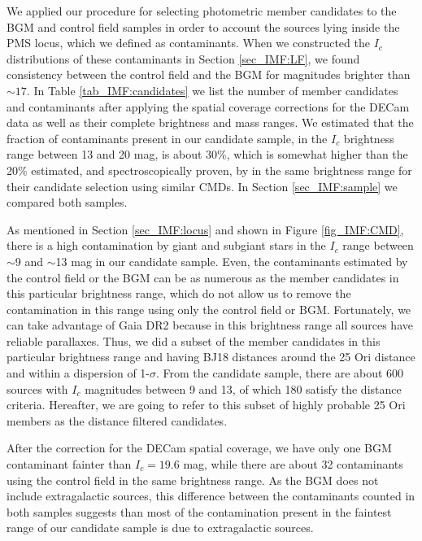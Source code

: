 \documentclass[12pt]{article}
\begin{document}
We applied our procedure for selecting photometric member candidates to the BGM and control field samples in order to account the sources lying inside the PMS locus, which we defined as contaminants. When we constructed the $I_c$ distributions of these contaminants in Section \ref{sec_IMF:LF}, we found consistency between the control field and the BGM for magnitudes brighter than $\sim 17$. In Table \ref{tab_IMF:candidates} we list the number of member candidates and contaminants after applying the spatial coverage corrections for the DECam data as well as their complete brightness and mass ranges. We estimated that the fraction of contaminants present in our candidate sample, in the $I_c$ brightness range between 13 and 20 mag, is about 30\%, which is somewhat higher than the 20\% estimated, and spectroscopically proven, by \citet{Downes2014} in the same brightness range for their candidate selection using similar CMDs. In Section \ref{sec_IMF:sample} we compared both samples. 

As mentioned in Section \ref{sec_IMF:locus} and shown in Figure \ref{fig_IMF:CMD}, there is a high contamination by giant and subgiant stars in the $I_c$ range between $\sim$9 and $\sim$13 mag in our candidate sample. Even, the contaminants estimated by the control field or the BGM can be as numerous as the member candidates in this particular brightness range, which do not allow us to remove the contamination in this range using only the control field or BGM. Fortunately, we can take advantage of Gaia DR2 because in this brightness range all sources have reliable parallaxes. Thus, we did a subset of the member candidates in this particular brightness range and having BJ18 distances around the 25 Ori distance and within a dispersion of 1-$\sigma$. From the candidate sample, there are about 600 sources with $I_c$ magnitudes between 9 and 13, of which 180 satisfy the distance criteria. Hereafter, we are going to refer to this subset of highly probable 25 Ori members as the distance filtered candidates.

After the correction for the DECam spatial coverage, we have only one BGM contaminant fainter than $I_c=19.6$ mag, while there are about 32 contaminants using the control field in the same brightness range. As the BGM does not include extragalactic sources, this difference between the contaminants counted in both samples suggests than most of the contamination present in the faintest range of our candidate sample is due to extragalactic sources. 
\end{document}
